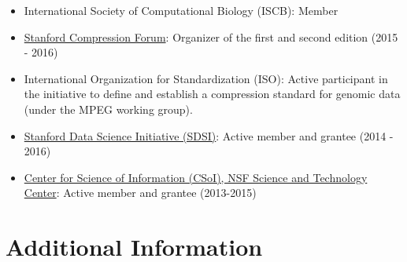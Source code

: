 \documentclass[11pt,a4paper,sans]{moderncv}        %
\begin{document}
\begin{itemize}
\item International Society of Computational Biology (ISCB): Member 
\item \href{https://compression.stanford.edu/}{Stanford Compression Forum}: Organizer of the first and second edition (2015 - 2016)
\item International Organization for Standardization (ISO): Active participant in the initiative to define and establish a compression standard for genomic data (under the MPEG working group).
\item \href{https://sdsi.stanford.edu/}{Stanford Data Science Initiative (SDSI)}: Active member and grantee (2014 - 2016)
\item \href{https://www.soihub.org/}{Center for Science of Information (CSoI), NSF Science and Technology Center}: Active member and grantee (2013-2015)
\end{itemize}
\vspace{5pt}



\section{Additional Information}
\end{document}
